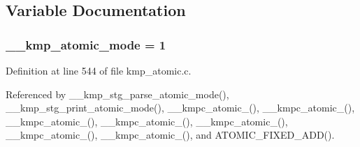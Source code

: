 \subsection{Variable Documentation}
\hypertarget{group__ATOMIC__OPS_ga934bb88de29998410569745b7fd2c2e6}{
\subsubsection[{\-\_\-\-\_\-kmp\-\_\-atomic\-\_\-mode}]{ \-\_\-\-\_\-kmp\-\_\-atomic\-\_\-mode = 1}}\label{group__ATOMIC__OPS_ga934bb88de29998410569745b7fd2c2e6}


Definition at line 544 of file kmp\-\_\-atomic.\-c.



Referenced by \-\_\-\-\_\-kmp\-\_\-stg\-\_\-parse\-\_\-atomic\-\_\-mode(), \-\_\-\-\_\-kmp\-\_\-stg\-\_\-print\-\_\-atomic\-\_\-mode(), \-\_\-\-\_\-kmpc\-\_\-atomic\-\_(), \-\_\-\-\_\-kmpc\-\_\-atomic\-\_(), \-\_\-\-\_\-kmpc\-\_\-atomic\-\_(), \-\_\-\-\_\-kmpc\-\_\-atomic\-\_(), \-\_\-\-\_\-kmpc\-\_\-atomic\-\_(), \-\_\-\-\_\-kmpc\-\_\-atomic\-\_(), \-\_\-\-\_\-kmpc\-\_\-atomic\-\_(), and A\-T\-O\-M\-I\-C\-\_\-\-F\-I\-X\-E\-D\-\_\-\-A\-D\-D().

